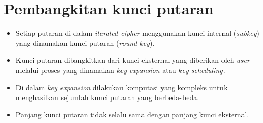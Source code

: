 \documentclass{article}
\begin{document}

\section*{Pembangkitan kunci putaran}

\begin{itemize}
    \item Setiap putaran di dalam \textit{iterated cipher} menggunakan kunci internal (\textit{subkey}) yang dinamakan kunci putaran (\textit{round key}).
    \item Kunci putaran dibangkitkan dari kunci eksternal yang diberikan oleh \textit{user} melalui proses yang dinamakan \textit{key expansion} atau \textit{key scheduling}.
    \item Di dalam \textit{key expansion} dilakukan komputasi yang kompleks untuk menghasilkan sejumlah kunci putaran yang berbeda-beda.
    \item Panjang kunci putaran tidak selalu sama dengan panjang kunci eksternal.
\end{itemize}
\end{document}
